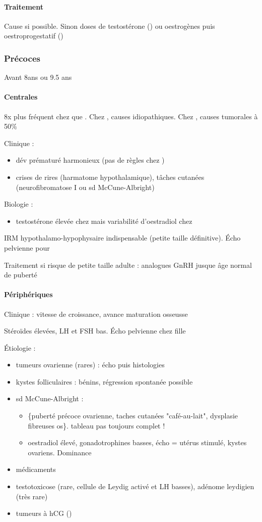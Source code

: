 \documentclass[11pt]{article}
\begin{document}
\paragraph{Traitement}
\label{sec:orgdb3ab8e}
Cause si possible. Sinon doses \inc de testostérone (\male) ou oestrogènes puis
oestroprogestatif (\female)
\subsubsection{Précoces}
\label{sec:org253b15e}
Avant 8ans \female ou 9.5 ans \male
\paragraph{Centrales}
\label{sec:orgc9e6e1e}
8x plus fréquent chez \female{} que \male{}. Chez \female{}, causes
idiopathiques. Chez \male{}, causes tumorales à 50\%

Clinique : 
\begin{itemize}
\item dév prématuré harmonieux (pas de règles chez \female)
\item crises de rires (harmatome hypothalamique), tâches cutanées (neurofibromatose
I ou sd McCune-Albright)
\end{itemize}
Biologie :
\begin{itemize}
\item testostérone élevée chez \male{} mais variabilité d'oestradiol chez \female{}
\end{itemize}

IRM hypothalamo-hypophysaire indispensable \danger (petite taille
définitive). Écho pelvienne pour \female{}

Traitement si risque de petite taille adulte : analogues GnRH jusque âge normal
de puberté
\paragraph{Périphériques}
\label{sec:org44f1084}
Clinique : \inc vitesse de croissance, avance maturation osseusse

Stéroïdes élevées, LH et FSH bas. Écho pelvienne chez fille

Étiologie :
\begin{itemize}
\item tumeurs ovarienne (rares) : écho puis histologies
\item kystes folliculaires : bénins, régression spontanée possible
\item sd McCune-Albright : 
\begin{itemize}
\item \{puberté précoce ovarienne, taches cutanées "café-au-lait", dysplasie fibreuses os\}. \danger tableau pas toujours complet !
\item oestradiol élevé, gonadotrophines basses, écho = utérus stimulé, kystes ovariens. Dominance \female
\end{itemize}
\item médicaments
\item testotoxicose (rare, cellule de Leydig activé et LH basses), adénome leydigien
(très rare)
\item tumeurs à hCG (\male)
\end{itemize}
\end{document}
